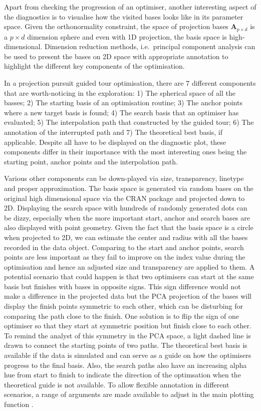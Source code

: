 Apart from checking the progression of an optimiser, another interesting
aspect of the diagnostics is to visualise how the visited bases looks
like in its parameter space. Given the orthonormality constraint, the
space of projection bases \(\mathbf{A}_{p \times d}\) is a
\(p \times d\) dimension sphere and even with 1D projection, the basis
space is high-dimensional. Dimension reduction methods, i.e.~principal
component analysis can be used to present the bases on 2D space with
appropriate annotation to highlight the different key components of the
optimisation.

In a projection pursuit guided tour optimisation, there are 7 different
components that are worth-noticing in the exploration: 1) The spherical
space of all the basses; 2) The starting basis of an optimisation
routine; 3) The anchor points where a new target basis is found; 4) The
search basis that an optimiser has evaluated; 5) The interpolation path
that constructed by the guided tour; 6) The annotation of the
interrupted path and 7) The theoretical best basis, if applicable.
Despite all have to be displayed on the diagnostic plot, these
components differ in their importance with the most interesting ones
being the starting point, anchor points and the interpolation path.

Various other components can be down-played via size, transparency,
linetype and proper approximation. The basis space is generated via
random bases on the original high dimensional space via the CRAN package
 \citep{geozoo} and projected down to 2D. Displaying the
search space with hundreds of randomly generated dots can be dizzy,
especially when the more important start, anchor and search bases are
also displayed with point geometry. Given the fact that the basis space
is a circle when projected to 2D, we can estimate the center and radius
with all the bases recorded in the data object. Comparing to the start
and anchor points, search points are less important as they fail to
improve on the index value during the optimisation and hence an adjusted
size and transparency are applied to them. A potential scenario that
could happen is that two optimisers can start at the same basis but
finishes with bases in opposite signs. This sign difference would not
make a difference in the projected data but the PCA projection of the
bases will display the finish points symmetric to each other, which can
be disturbing for comparing the path close to the finish. One solution
is to flip the sign of one optimiser so that they start at symmetric
position but finish close to each other. To remind the analyst of this
symmetry in the PCA space, a light dashed line is drawn to connect the
starting points of two paths. The theoretical best basis is available if
the data is simulated and can serve as a guide on how the optimisers
progress to the final basis. Also, the search paths also have an
increasing alpha hue from start to finish to indicate the direction of
the optimsation when the theoretical guide is not available. To allow
flexible annotation in different scenarios, a range of arguments are
made available to adjust in the main plotting function
.

